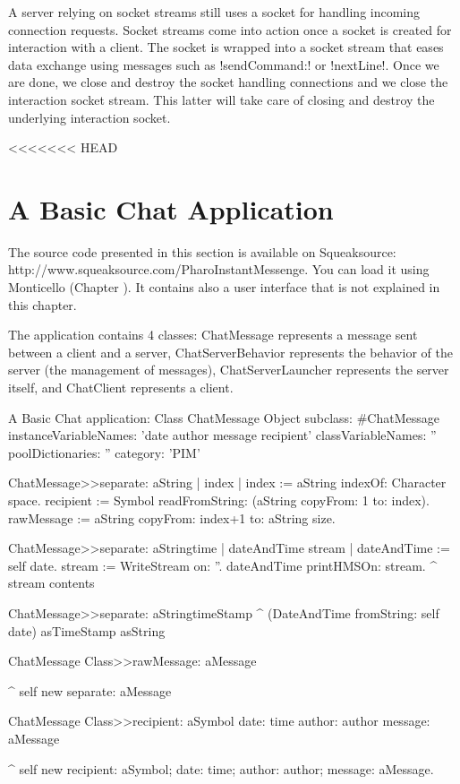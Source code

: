 \documentclass[a4paper,10pt,twoside]{book}
\begin{document}
A server relying on socket streams still uses a socket for handling incoming connection requests.
Socket streams come into action once a socket is created for interaction with a client.
The socket is wrapped into a socket stream that eases data exchange using messages such as \ct!sendCommand:! or \ct!nextLine!.
Once we are done, we close and destroy the socket handling connections and we close the interaction socket stream.
This latter will take care of closing and destroy the underlying interaction socket.

<<<<<<< HEAD
\section{A Basic Chat Application}

The source code presented in this section is available on Squeaksource: http://www.squeaksource.com/PharoInstantMessenge. You can load it using Monticello (Chapter ). It contains also a user interface that is not explained in this chapter.

The application contains 4 classes: ChatMessage represents a message sent between a client and a server, ChatServerBehavior represents the behavior of the server (\eg the management of messages), ChatServerLauncher represents the server itself, and ChatClient represents a client.

\begin{script}{A Basic Chat application: Class ChatMessage}
Object subclass: #ChatMessage
	instanceVariableNames: 'date author message recipient'
	classVariableNames: ''
	poolDictionaries: ''
	category: 'PIM'

ChatMessage>>separate: aString
	| index |
	index := aString indexOf: Character space.
	recipient := Symbol readFromString: (aString copyFrom: 1 to: index).
	rawMessage := aString copyFrom: index+1 to: aString size.

ChatMessage>>separate: aStringtime
	| dateAndTime stream |
	dateAndTime := self date.
	stream := WriteStream on: ''.
	dateAndTime printHMSOn: stream.
	^ stream contents

ChatMessage>>separate: aStringtimeStamp
	^ (DateAndTime fromString: self date) asTimeStamp asString

ChatMessage Class>>rawMessage: aMessage

	^ self new separate: aMessage

ChatMessage Class>>recipient: aSymbol date: time author: author message: aMessage

	^ self new
			recipient: aSymbol;
			date: time;
			author: author;
			message: aMessage.
\end{script}
\end{document}
